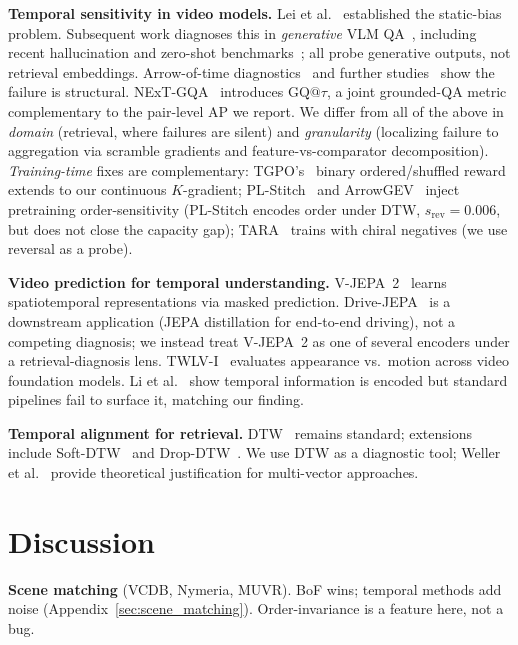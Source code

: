 \documentclass{article}
\theoremstyle{remark}
\begin{document}
\textbf{Temporal sensitivity in video models.} Lei et al.~\cite{lei2022singleframe} established the static-bias problem. Subsequent work diagnoses this in \emph{generative} VLM QA~\cite{tempcompass,bagad2023testtime,temporalbench,vbenchcomp,tomato}, including recent hallucination and zero-shot benchmarks~\cite{infact,videozerobench}; all probe generative outputs, not retrieval embeddings. Arrow-of-time diagnostics~\cite{aot,arrowrl} and further studies~\cite{timeblindness,timeblind,vitatecs,reveal,weavetime} show the failure is structural. NExT-GQA~\cite{nextgqa} introduces $\mathrm{GQ}@\tau$, a joint grounded-QA metric complementary to the pair-level AP we report. We differ from all of the above in \emph{domain} (retrieval, where failures are silent) and \emph{granularity} (localizing failure to aggregation via scramble gradients and feature-vs-comparator decomposition). \emph{Training-time} fixes are complementary: TGPO's~\cite{tgpo} binary ordered/shuffled reward extends to our continuous $K$-gradient; PL-Stitch~\cite{plstitch} and ArrowGEV~\cite{arrowgev} inject pretraining order-sensitivity (PL-Stitch encodes order under DTW, $s_\text{rev}\!=\!0.006$, but does not close the capacity gap); TARA~\cite{tara} trains with chiral negatives (we use reversal as a probe).

\textbf{Video prediction for temporal understanding.} V-JEPA~2~\cite{vjepa2} learns spatiotemporal representations via masked prediction. Drive-JEPA~\cite{drivejepa} is a downstream application (JEPA distillation for end-to-end driving), not a competing diagnosis; we instead treat V-JEPA~2 as one of several encoders under a retrieval-diagnosis lens. TWLV-I~\cite{twlvi} evaluates appearance vs.\ motion across video foundation models. Li et al.~\cite{temporaltransfer} show temporal information is encoded but standard pipelines fail to surface it, matching our finding.

\textbf{Temporal alignment for retrieval.} DTW~\cite{sakoe1978dtw} remains standard; extensions include Soft-DTW~\cite{ddtw} and Drop-DTW~\cite{dropdtw}. We use DTW as a diagnostic tool; Weller et al.~\cite{weller2025limits} provide theoretical justification for multi-vector approaches.

\section{Discussion}
\label{sec:discussion}

\textbf{Scene matching} (VCDB, Nymeria, MUVR). BoF wins; temporal methods add noise (Appendix~\ref{sec:scene_matching}). Order-invariance is a feature here, not a bug.
\end{document}
